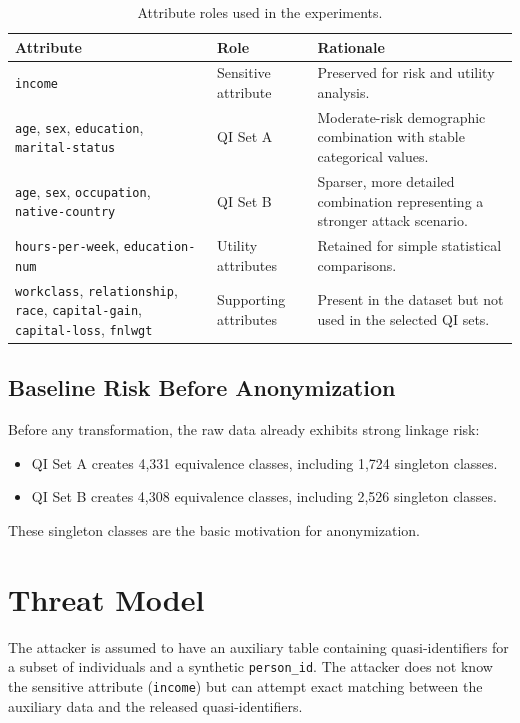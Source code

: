 \documentclass[11pt]{article}
\begin{document}
\begin{table}[H]
\centering
\begin{tabularx}{\textwidth}{>{\raggedright\arraybackslash}p{} >{\raggedright\arraybackslash}p{} X}
\toprule
\textbf{Attribute} & \textbf{Role} & \textbf{Rationale} \\
\midrule
\texttt{income} & Sensitive attribute & Preserved for risk and utility analysis. \\
\texttt{age}, \texttt{sex}, \texttt{education}, \texttt{marital-status} & QI Set A & Moderate-risk demographic combination with stable categorical values. \\
\texttt{age}, \texttt{sex}, \texttt{occupation}, \texttt{native-country} & QI Set B & Sparser, more detailed combination representing a stronger attack scenario. \\
\texttt{hours-per-week}, \texttt{education-num} & Utility attributes & Retained for simple statistical comparisons. \\
\texttt{workclass}, \texttt{relationship}, \texttt{race}, \texttt{capital-gain}, \texttt{capital-loss}, \texttt{fnlwgt} & Supporting attributes & Present in the dataset but not used in the selected QI sets. \\
\bottomrule
\end{tabularx}
\caption{Attribute roles used in the experiments.}
\label{tab:attribute_roles}
\end{table}

\subsection{Baseline Risk Before Anonymization}
Before any transformation, the raw data already exhibits strong linkage risk:
\begin{itemize}[leftmargin=*]
    \item QI Set A creates 4,331 equivalence classes, including 1,724 singleton classes.
    \item QI Set B creates 4,308 equivalence classes, including 2,526 singleton classes.
\end{itemize}

These singleton classes are the basic motivation for anonymization.

\section{Threat Model}
The attacker is assumed to have an auxiliary table containing quasi-identifiers for a subset of individuals and a synthetic \texttt{person\_id}. The attacker does not know the sensitive attribute (\texttt{income}) but can attempt exact matching between the auxiliary data and the released quasi-identifiers.
\end{document}
